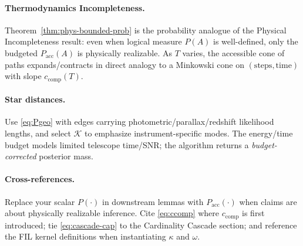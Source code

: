 \paragraph{Thermodynamics Incompleteness.}
Theorem~\ref{thm:phys-bounded-prob} is the probability analogue of the Physical Incompleteness
result: even when logical measure $P(A)$ is well-defined, only the budgeted $P_{\mathrm{acc}}(A)$ is
physically realizable. As $T$ varies, the accessible cone of paths expands/contracts in direct
analogy to a Minkowski cone on $(\mathrm{steps},\mathrm{time})$ with slope $c_{\mathrm{comp}}(T)$.

\paragraph{Star distances.}
Use \eqref{eq:Pgeo} with edges carrying photometric/parallax/redshift likelihood lengths,
and select $\mathcal{K}$ to emphasize instrument-specific modes. The energy/time budget
models limited telescope time/SNR; the algorithm returns a \emph{budget-corrected} posterior mass.

\paragraph{Cross-references.}
Replace your scalar $P(\cdot)$ in downstream lemmas with $P_{\mathrm{acc}}(\cdot)$ when claims are about
physically realizable inference. Cite \eqref{eq:ccomp} where $c_{\mathrm{comp}}$ is first introduced;
tie \eqref{eq:cascade-cap} to the Cardinality Cascade section; and reference the FIL kernel
definitions when instantiating $\kappa$ and $\omega$.
